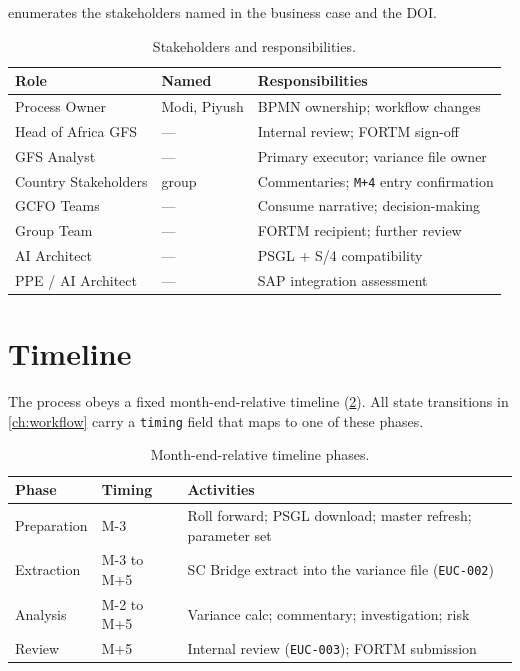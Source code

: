  enumerates the stakeholders named in the
business case and the DOI.

\begin{table}[htbp]
\caption{Stakeholders and responsibilities.}\label{tab:stakeholders}
\centering
\small
\begin{tabularx}{\linewidth}{@{}llX@{}}
\toprule
\textbf{Role} & \textbf{Named} & \textbf{Responsibilities} \\ \midrule
Process Owner             & Modi, Piyush & BPMN ownership; workflow changes \\
Head of Africa GFS        & ---          & Internal review; FORTM sign-off \\
GFS Analyst               & ---          & Primary executor; variance file owner \\
Country Stakeholders      & group        & Commentaries; \texttt{M+4} entry confirmation \\
GCFO Teams                & ---          & Consume narrative; decision-making \\
Group Team                & ---          & FORTM recipient; further review \\
AI Architect              & ---          & PSGL + S/4 compatibility \\
PPE / AI Architect        & ---          & SAP integration assessment \\
\bottomrule
\end{tabularx}
\end{table}

\section{Timeline}

The process obeys a fixed month-end-relative timeline
(\cref{tab:timeline}). All state transitions in \cref{ch:workflow}
carry a \texttt{timing} field that maps to one of these phases.

\begin{table}[htbp]
\caption{Month-end-relative timeline phases.}\label{tab:timeline}
\centering
\small
\begin{tabularx}{\linewidth}{@{}llX@{}}
\toprule
\textbf{Phase} & \textbf{Timing} & \textbf{Activities} \\ \midrule
Preparation & M-3        & Roll forward; PSGL download; master refresh; parameter set \\
Extraction  & M-3 to M+5 & SC Bridge extract into the variance file (\texttt{EUC-002}) \\
Analysis    & M-2 to M+5 & Variance calc; commentary; investigation; risk \\
Review      & M+5        & Internal review (\texttt{EUC-003}); FORTM submission \\
\bottomrule
\end{tabularx}
\end{table}

